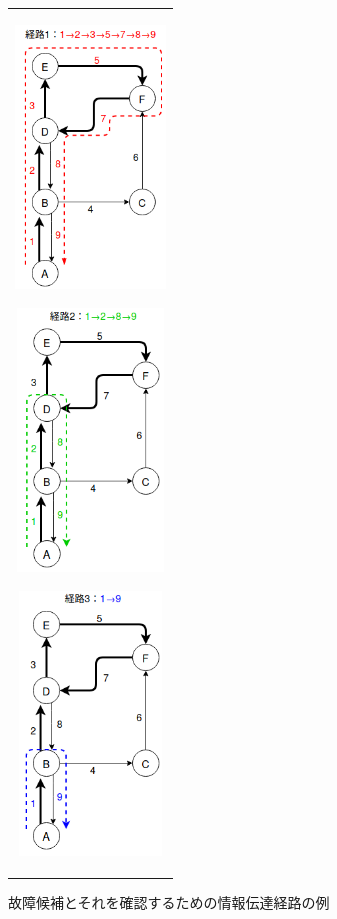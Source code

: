 \documentclass[11pt]{jsreport}
\begin{document}
\begin{figure}[H]
   \centering
      \begin{tabular}{c}
         \begin{minipage}{0.30\hsize}
         \centering
         \includegraphics[height=7cm]{figure/route1.png}
            \label{fig:route1}
         \end{minipage}
         \begin{minipage}{0.30\hsize}
         \centering
         \includegraphics[height=7cm]{figure/route2.png}
            \label{fig:route2}
         \end{minipage}
         \begin{minipage}{0.30\hsize}
            \centering
            \includegraphics[height=7cm]{figure/route3.png}
               \label{fig:route2}
            \end{minipage}
      \end{tabular} 
      \caption{故障候補とそれを確認するための情報伝達経路の例}%
      \label{fig:route}
\end{figure}
\end{document}

